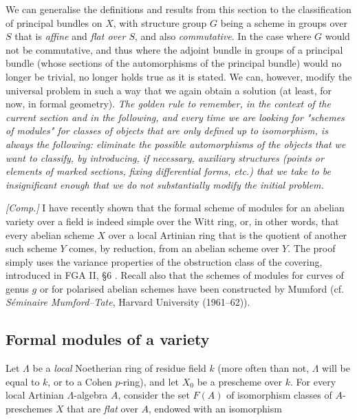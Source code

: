 \begin{remark}\label{fga3.ii-c.3-remarks-i}
    We can generalise the definitions and results from this section to the classification of principal bundles on $X$, with structure group $G$ being a scheme in groups over $S$ that is \emph{affine} and \emph{flat over $S$}, and also \emph{commutative}.
    In the case where $G$ would not be commutative, and thus where the adjoint bundle in groups of a principal bundle (whose sections of the automorphisms of the principal bundle) would no longer be trivial,  no longer holds true as it is stated.
    We can, however, modify the universal problem in such a way that we again obtain a solution (at least, for now, in formal geometry).
    \emph{The golden rule to remember, in the context of the current section and in the following, and every time we are looking for "schemes of modules" for classes of objects that are only defined up to isomorphism, is always the following: eliminate the possible automorphisms of the objects that we want to classify, by introducing, if necessary, auxiliary structures (points or elements of marked sections, fixing differential forms, etc.) that we take to be insignificant enough that we do not substantially modify the initial problem.}
\end{remark}

\begin{remark}\label{fga3.ii-c.3-remarks-ii}
    \emph{[Comp.]}
    I have recently shown that the formal scheme of modules for an abelian variety over a field is indeed simple over the Witt ring, or, in other words, that every abelian scheme $X$ over a local Artinian ring that is the quotient of another such scheme $Y$ comes, by reduction, from an abelian scheme over $Y$.
    The proof simply uses the variance properties of the obstruction class of the covering, introduced in FGA II, §6  .
    Recall also that the schemes of modules for curves of genus $g$ or for polarised abelian schemes have been constructed by Mumford (cf. \emph{Séminaire Mumford–Tate}, Harvard University (1961–62)).
\end{remark}

\subsection{Formal modules of a variety}\label{fga3.ii-c.4}

Let $\Lambda$ be a \emph{local} Noetherian ring of residue field $k$ (more often than not, $\Lambda$ will be equal to $k$, or to a Cohen $p$-ring), and let $X_0$ be a prescheme over $k$.
For every local Artinian $\Lambda$-algebra $A$, consider the set $F(A)$ of isomorphism classes of $A$-preschemes $X$ that are \emph{flat} over $A$, endowed with an isomorphism

